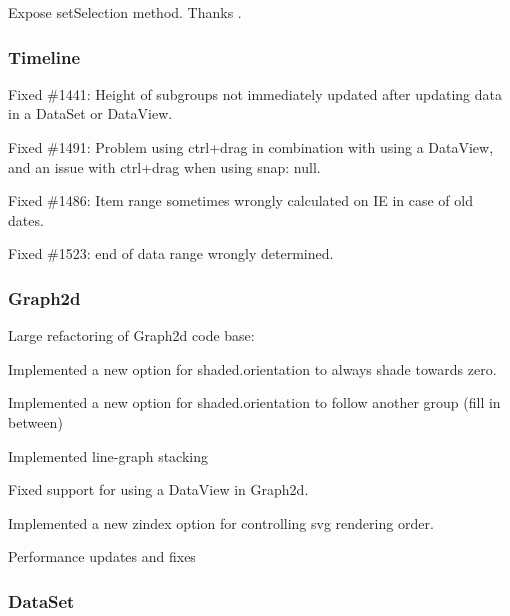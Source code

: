 \begin{DoxyItemize}
\item Expose {\ttfamily set\+Selection} method. Thanks .
\end{DoxyItemize}

\subsubsection*{Timeline}


\begin{DoxyItemize}
\item Fixed \#1441\+: Height of subgroups not immediately updated after updating data in a Data\+Set or Data\+View.
\item Fixed \#1491\+: Problem using ctrl+drag in combination with using a {\ttfamily Data\+View}, and an issue with ctrl+drag when using {\ttfamily snap\+: null}.
\item Fixed \#1486\+: Item range sometimes wrongly calculated on IE in case of old dates.
\item Fixed \#1523\+: end of data range wrongly determined.
\end{DoxyItemize}

\subsubsection*{Graph2d}


\begin{DoxyItemize}
\item Large refactoring of Graph2d code base\+:
\begin{DoxyItemize}
\item Implemented a new option for {\ttfamily shaded.\+orientation} to always shade towards zero.
\item Implemented a new option for {\ttfamily shaded.\+orientation} to follow another group (fill in between)
\item Implemented line-\/graph stacking
\item Fixed support for using a {\ttfamily Data\+View} in Graph2d.
\item Implemented a new zindex option for controlling svg rendering order.
\item Performance updates and fixes
\end{DoxyItemize}
\end{DoxyItemize}

\subsubsection*{Data\+Set}


